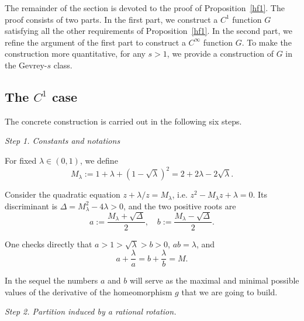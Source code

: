 \documentclass{amsart}
\begin{document}
	The remainder of the section is devoted to the proof of Proposition~\ref{hf1}. The proof consists of two parts. In the first part, we construct a \(C^1\) function \(G\) satisfying all the other requirements of Proposition~\ref{hf1}. In the second part, we refine the argument of the first part to construct a \(C^\infty\) function \(G\). To make the construction more quantitative, for any \(s > 1\), we  provide a construction of \(G\) in the Gevrey-\(s\) class.
	
	\subsection{The \(C^1\) case}
	The concrete construction is carried out in the following six steps.
	
	\vspace{1ex}
	
	\textit{Step 1. Constants and notations}
	
	For fixed $\lambda \in (0,1)$, we define
	\begin{equation}
		M_{\lambda}:=1+\lambda+(1-\sqrt{\lambda})^2 = 2+2\lambda-2\sqrt{\lambda}.
	\end{equation}
	
	Consider the quadratic equation $z+\lambda/z = M_{\lambda}$, i.e. $z^2-M_{\lambda}z+\lambda=0$. Its discriminant is $\Delta = M_{\lambda}^2-4\lambda >0$, and the two positive roots are
	\[
	a:=\frac{M_{\lambda}+\sqrt{\Delta}}{2},\quad b:=\frac{M_{\lambda}-\sqrt{\Delta}}{2}.
	\]
	
	One checks directly that $a>1>\sqrt\lambda>b>0$, $ab=\lambda$, and
	\begin{equation}
		a+\frac{\lambda}{a}=b+\frac{\lambda}{b}=M.
	\end{equation}
	
	In the sequel the numbers $a$ and $b$ will serve as the maximal and minimal possible values of the derivative of the homeomorphism $g$ that we are going to build.
	
	\vspace{1ex}
	
	\textit{Step 2. Partition induced by a rational rotation.}
	
\end{document}
